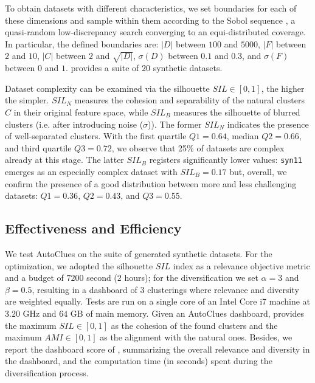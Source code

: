 To obtain datasets with different characteristics, we set boundaries for each of these dimensions and sample within them according to the Sobol sequence \cite{sobol1967distribution}, a quasi-random low-discrepancy search converging to an equi-distributed coverage.
In particular, the defined boundaries are: $|D|$ between $100$ and $5000$, $|F|$ between $2$ and $10$, $|C|$ between $2$ and $\sqrt{|D|}$, $\sigma(D)$ between $0.1$ and $0.3$, and $\sigma(F)$ between $0$ and $1$.
 provides a suite of $20$ synthetic datasets.

Dataset complexity can be examined via the silhouette $SIL \in [0, 1]$, the higher the simpler.
$SIL_N$ measures the cohesion and separability of the natural clusters $C$ in their original feature space, while  $SIL_B$ measures the silhouette of blurred clusters (i.e. after introducing noise ($\sigma$)).
The former $SIL_N$ indicates the presence of well-separated clusters.
With the first quartile $Q1=0.64$, median $Q2=0.66$, and third quartile $Q3=0.72$, we observe that 25\% of datasets are complex already at this stage.
The latter $SIL_B$ registers significantly lower values: \texttt{syn11} emerges as an especially complex dataset with $SIL_B=0.17$ but, overall, we confirm the presence of a good distribution between more and less challenging datasets: $Q1 = 0.36$, $Q2 = 0.43$, and $Q3 = 0.55$.

\subsection{Effectiveness and Efficiency}
\label{clustering-ssec:effectiveness}


We test AutoClues on the suite of generated synthetic datasets.
For the optimization, we adopted the silhouette $SIL$ index as a relevance objective metric and a budget of $7200$ second ($2$ hours); for the diversification we set $\alpha=3$ and $\beta=0.5$, resulting in a dashboard of $3$ clusterings where relevance and diversity are weighted equally.
Tests are run on a single core of an Intel Core i7 machine at $3.20$ GHz and $64$ GB of main memory.
%
Given an AutoClues dashboard,  provides
the maximum $SIL\in [0, 1]$ as the cohesion of the found clusters and the maximum $AMI \in [0, 1]$ as the alignment with the natural ones. Besides, we report the dashboard score of , summarizing the overall relevance and diversity in the dashboard, and the computation time (in seconds) spent during the diversification process. 

